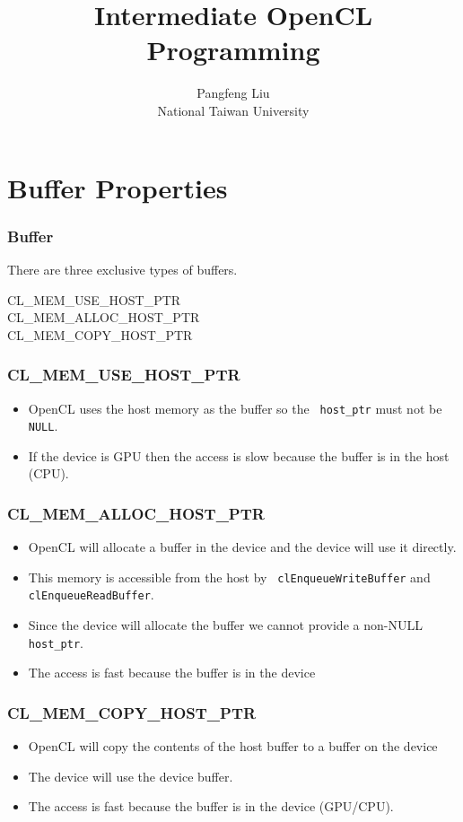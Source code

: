 \documentclass{beamer}
\begin{document}
\title{Intermediate OpenCL Programming}

\author{Pangfeng Liu \\ National Taiwan University}

\begin{frame}
  \titlepage
\end{frame}

\section{Buffer Properties}

\begin{frame}
  \frametitle{Buffer} 
  There are three exclusive types of buffers.  
  \begin{description}
  \item [CL\_MEM\_USE\_HOST\_PTR]
  \item [CL\_MEM\_ALLOC\_HOST\_PTR]
  \item [CL\_MEM\_COPY\_HOST\_PTR]
  \end{description}
\end{frame}

\begin{frame}
  \frametitle{CL\_MEM\_USE\_HOST\_PTR} 
  \begin{itemize}
  \item OpenCL uses the host memory as the buffer so the {\tt
    host\_ptr} must not be {\tt NULL}.
  \item If the device is GPU then the access is slow because the
    buffer is in the host (CPU).
  \end{itemize}
\end{frame}

\begin{frame}
  \frametitle{CL\_MEM\_ALLOC\_HOST\_PTR} 
  \begin{itemize}
  \item OpenCL will allocate a buffer in the device and the device
    will use it directly.
  \item This memory is accessible from the host by {\tt
    clEnqueueWriteBuffer} and {\tt clEnqueueReadBuffer}.
  \item Since the device will allocate the buffer we cannot provide a
    non-NULL {\tt host\_ptr}.
  \item The access is fast because the buffer is in the device
  \end{itemize}
\end{frame}

\begin{frame}
  \frametitle{CL\_MEM\_COPY\_HOST\_PTR} 
  \begin{itemize}
  \item OpenCL will copy the contents of the host buffer to a
    buffer on the device
  \item The device will use the device buffer.
  \item The access is fast because the buffer is in the device
    (GPU/CPU).
  \end{itemize}
\end{frame}
\end{document}

